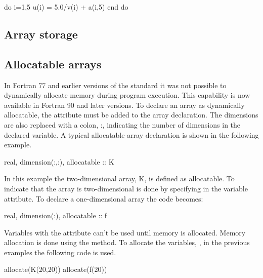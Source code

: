 \begin{fortrancodeenv}
do i=1,5
    u(i) = 5.0/v(i) + a(i,5)
end do
\end{fortrancodeenv}

\subsection{Array storage}

\subsection{Allocatable arrays}

In Fortran 77 and earlier versions of the standard it was not possible to dynamically allocate memory during program execution. This capability is now available in Fortran 90 and later versions. To declare an array as dynamically allocatable, the attribute  must be added to the array declaration. The dimensions are also replaced with a colon, :, indicating the number of dimensions in the declared variable. A typical allocatable array declaration is shown in the following example.

\begin{fortrancodeenv}
real, dimension(:,:), allocatable :: K
\end{fortrancodeenv}

In this example the two-dimensional array, K, is defined as allocatable. To indicate that the array is two-dimensional is done by specifying  in the variable attribute. To declare a one-dimensional array the code becomes:

\begin{fortrancodeenv}
real, dimension(:), allocatable :: f
\end{fortrancodeenv}

Variables with the  attribute can't be used until memory is allocated. Memory allocation is done using the  method. To allocate the variables, , in the previous examples the following code is used.

\begin{fortrancodeenv}
allocate(K(20,20))
allocate(f(20))
\end{fortrancodeenv}

